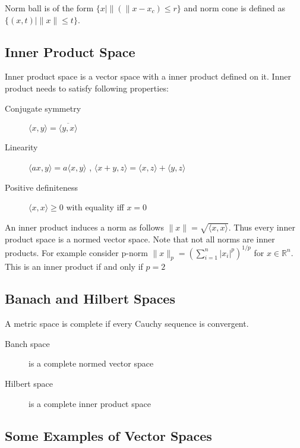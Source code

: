 \documentclass[a4paper,11pt]{article}
\newcommand{\Rn}{\mathbb{R}^n}
\newcommand{\norm}[1]{\|#1\|}
\newcommand*\conj[1]{\overline{#1}}
\newcommand\inrpd[2]{\langle #1, #2 \rangle}
\begin{document}
Norm ball is of the form $\{x \mid \norm(x-x_c) \leq r \}$ and norm cone is defined as $\{(x,t) \mid \norm{x} \leq t \}$.

\subsection{Inner Product Space}
Inner product space is a vector space with a inner product defined on it. Inner product needs to satisfy following properties:
\begin{description}
\item[Conjugate symmetry] $\inrpd{x}{y}= \conj{\inrpd{y}{x}}$
\item[Linearity] $\inrpd{ax}{y} = a  \inrpd{x}{y}$ , $\inrpd{x+y}{z} =  \inrpd{x}{z}+ \inrpd{y}{z}$
\item[Positive definiteness] $\inrpd{x}{x} \geq 0$ with equality iff $x = 0$
\end{description} 

An inner product induces a norm as follows $\|x\| = \sqrt{\inrpd{x}{x}}$. Thus every inner product space is a normed vector space.
Note that not all norms are inner products. For example consider p-norm $\|x\|_p = \left(\sum_{i = 1}^n |x_i|^p \right)^{1/p}$ for $x \in \Rn$. This is an inner product if and only if $p = 2$

\subsection{Banach and Hilbert Spaces}
A metric space is complete if every Cauchy sequence is convergent.
\begin{description}
\item[Banch space] is a complete normed vector space
\item[Hilbert space] is a complete inner product space
\end{description}

\subsection{Some Examples of Vector Spaces}
\end{document}
